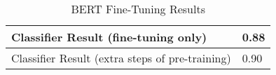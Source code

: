 \begin{table}[!ht]
	\centering
	\begin{tabulary}{1.0\textwidth}{ L | L } 
		\hline
		Classifier Result (fine-tuning only)  &   0.88    \\ 
		\hline
		Classifier Result (extra steps of pre-training)   &   0.90  \\
		\hline
	\end{tabulary}
	\caption{BERT Fine-Tuning Results}
	\label{results:table1}
\end{table}


